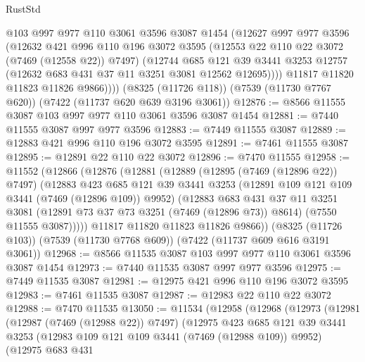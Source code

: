\begin{lexlean}{RustStd}
\begin{coremodule}
            @103
            @997
            @977
            @110
            @3061
            @3596
            @3087
            @1454
            (@12627
              @997
              @977
              @3596
              (@12632
                @421
                @996
                @110
                @196
                @3072
                @3595
                (@12553 @22 @110 @22 @3072 (@7469 (@12558 @22)) @7497)
                (@12744
                  @685
                  @121
                  @39
                  @3441
                  @3253
                  @12757
                  (@12632 @683 @431 @37 @11 @3251 @3081 @12562 @12695))))
            @11817
            @11820
            @11823
            @11826
            @9866))))
    (@8325 (@11726 @118))
    (@7539 (@11730 @7767 @620))
    (@7422 (@11737 @620 @639 @3196 @3061))
@12876 := @8566 @11555 @3087 @103 @997 @977 @110 @3061 @3596 @3087 @1454
@12881 := @7440 @11555 @3087 @997 @977 @3596
@12883 := @7449 @11555 @3087
@12889 := @12883 @421 @996 @110 @196 @3072 @3595
@12891 := @7461 @11555 @3087
@12895 := @12891 @22 @110 @22 @3072
@12896 := @7470 @11555
@12958 := @11552
    (@12866
      (@12876
        (@12881
          (@12889
            (@12895 (@7469 (@12896 @22)) @7497)
            (@12883
              @423
              @685
              @121
              @39
              @3441
              @3253
              (@12891 @109 @121 @109 @3441 (@7469 (@12896 @109)) @9952)
              (@12883
                @683
                @431
                @37
                @11
                @3251
                @3081
                (@12891 @73 @37 @73 @3251 (@7469 (@12896 @73)) @8614)
                (@7550 @11555 @3087)))))
        @11817
        @11820
        @11823
        @11826
        @9866))
    (@8325 (@11726 @103))
    (@7539 (@11730 @7768 @609))
    (@7422 (@11737 @609 @616 @3191 @3061))
@12968 := @8566 @11535 @3087 @103 @997 @977 @110 @3061 @3596 @3087 @1454
@12973 := @7440 @11535 @3087 @997 @977 @3596
@12975 := @7449 @11535 @3087
@12981 := @12975 @421 @996 @110 @196 @3072 @3595
@12983 := @7461 @11535 @3087
@12987 := @12983 @22 @110 @22 @3072
@12988 := @7470 @11535
@13050 := @11534
    (@12958
      (@12968
        (@12973
          (@12981
            (@12987 (@7469 (@12988 @22)) @7497)
            (@12975
              @423
              @685
              @121
              @39
              @3441
              @3253
              (@12983 @109 @121 @109 @3441 (@7469 (@12988 @109)) @9952)
              (@12975
                @683
                @431

\end{coremodule}
\end{lexlean}
